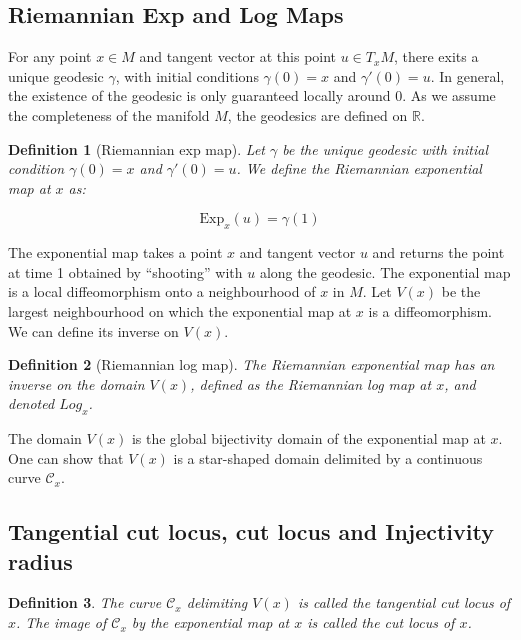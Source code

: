 \documentclass{article}
\newtheorem{definition}{Definition}
\begin{document}
\subsection{Riemannian Exp and Log Maps}

For any point $x \in M$ and tangent vector at this point $u \in T_xM$, there exits a unique geodesic $\gamma$, with initial conditions 
$\gamma(0) = x$ and $\gamma'(0) = u$. In general, the existence of the geodesic is only guaranteed locally around 0. As we assume 
the completeness of the manifold $M$, the geodesics are defined on $\mathbb{R}$.

\begin{definition}[Riemannian exp map]
Let $\gamma$ be the unique geodesic with initial condition $\gamma(0)=x$ and  $\gamma'(0)=u$. We define the Riemannian exponential map 
at $x$ as:

\begin{equation}
    \mathrm{Exp}_x(u) = \gamma(1)
\end{equation}
\end{definition}


The exponential map takes a point $x$ and tangent vector $u$ and returns the point at time 1 obtained by “shooting” with
$u$ along the geodesic. The exponential map is a local diffeomorphism onto a neighbourhood of $x$ in $M$. Let $V(x)$
be the largest neighbourhood on which the exponential map at $x$ is a diffeomorphism. We can define its inverse on $V (x)$.


\begin{definition}[Riemannian log map]
The Riemannian exponential map has an inverse on the domain $V (x)$, defined as the Riemannian log map at $x$, and denoted $Log_x$.
\end{definition}

The domain $V (x)$ is the global bijectivity domain of the exponential map at $x$. 
One can show that $V (x)$ is a star-shaped domain delimited by a continuous curve $\mathcal{C}_x$.

\subsection{Tangential cut locus, cut locus and Injectivity radius}

\begin{definition}
    The curve $\mathcal{C}_x$ delimiting $V(x)$ is called the tangential cut locus of $x$. 
    The image of $\mathcal{C}_x$ by the exponential map at $x$ is called the cut locus of $x$.
\end{definition}
\end{document}
